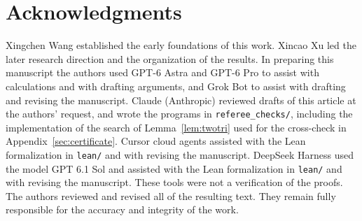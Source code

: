 \documentclass[ASNA]{USG}
\theoremstyle{WBstyletwo}
\numberwithin{equation}{section}
\begin{document}
\section*{Acknowledgments}
Xingchen Wang established the early foundations of this work. Xincao Xu led the later research direction and the organization of the results. In preparing this manuscript the authors used GPT-6 Astra and GPT-6 Pro to assist with calculations and with drafting arguments, and Grok Bot to assist with drafting and revising the manuscript. Claude (Anthropic) reviewed drafts of this article at the authors' request, and wrote the programs in \texttt{referee\_checks/}, including the implementation of the search of Lemma~\ref{lem:twotri} used for the cross-check in Appendix~\ref{sec:certificate}. Cursor cloud agents assisted with the Lean formalization in \texttt{lean/} and with revising the manuscript. DeepSeek Harness used the model GPT 6.1 Sol and assisted with the Lean formalization in \texttt{lean/} and with revising the manuscript. These tools were not a verification of the proofs. The authors reviewed and revised all of the resulting text. They remain fully responsible for the accuracy and integrity of the work.


\end{document}
